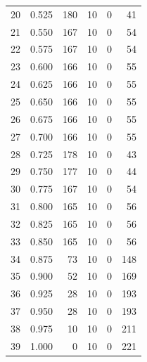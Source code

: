 \documentclass[a4paper,twoside,12pt]{book}
\begin{document}
\begin{appendices}
\begin{table}
\begin{tabular}{lrrrrr}
		20 &  0.525 &       180 &        10 &               0 &              41 \\
		21 &  0.550 &       167 &        10 &               0 &              54 \\
		22 &  0.575 &       167 &        10 &               0 &              54 \\
		23 &  0.600 &       166 &        10 &               0 &              55 \\
		24 &  0.625 &       166 &        10 &               0 &              55 \\
		25 &  0.650 &       166 &        10 &               0 &              55 \\
		26 &  0.675 &       166 &        10 &               0 &              55 \\
		27 &  0.700 &       166 &        10 &               0 &              55 \\
		28 &  0.725 &       178 &        10 &               0 &              43 \\
		29 &  0.750 &       177 &        10 &               0 &              44 \\
		30 &  0.775 &       167 &        10 &               0 &              54 \\
		31 &  0.800 &       165 &        10 &               0 &              56 \\
		32 &  0.825 &       165 &        10 &               0 &              56 \\
		33 &  0.850 &       165 &        10 &               0 &              56 \\
		34 &  0.875 &        73 &        10 &               0 &             148 \\
		35 &  0.900 &        52 &        10 &               0 &             169 \\
		36 &  0.925 &        28 &        10 &               0 &             193 \\
		37 &  0.950 &        28 &        10 &               0 &             193 \\
		38 &  0.975 &        10 &        10 &               0 &             211 \\
		39 &  1.000 &         0 &        10 &               0 &             221 \\
		\bottomrule
		\end{tabular}		
\end{table}


\end{appendices}
\end{document}

